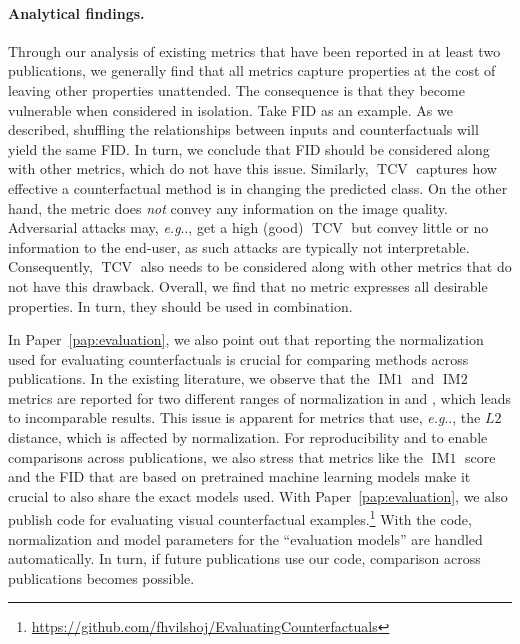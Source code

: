 \documentclass[11pt,a4paper,twoside,openright,final]{memoir}
\makeatletter
\DeclareRobustCommand\onedot{\futurelet\@let@token\@onedot}
\def\@onedot{\ifx\@let@token.\else.\null\fi\xspace}
\def\eg{\emph{e.g}\onedot} \def\Eg{\emph{E.g}\onedot}
\newcommand*{\paperref}[1]{Paper~\hyperref[#1]{\ref{#1}}}
\makeatother
\begin{document}
\paragraph{Analytical findings.}
Through our analysis of existing metrics that have been reported in at least two publications, we generally find that all metrics capture properties at the cost of leaving other properties unattended.
The consequence is that they become vulnerable when considered in isolation.
Take FID as an example.
As we described, shuffling the relationships between inputs and counterfactuals will yield the same FID.
In turn, we conclude that FID should be considered along with other metrics, which do not have this issue.
Similarly, $\operatorname{TCV}$ captures how effective a counterfactual method is in changing the predicted class. 
On the other hand, the metric does \emph{not} convey any information on the image quality.
Adversarial attacks may, \eg, get a high (good) $\operatorname{TCV}$ but convey little or no information to the end-user, as such attacks are typically not interpretable.
Consequently, $\operatorname{TCV}$ also needs to be considered along with other metrics that do not have this drawback.
Overall, we find that no metric expresses all desirable properties. In turn, they should be used in combination.

In \paperref{pap:evaluation}, we also point out that reporting the normalization used for evaluating counterfactuals is crucial for comparing methods across publications.
In the existing literature, we observe that the $\operatorname{IM1}$ and $\operatorname{IM2}$ metrics are reported for two different ranges of normalization in \cite{Mahajan2019} and \cite{VanLooveren2019}, which leads to incomparable results.
This issue is apparent for metrics that use, \eg, the $L2$ distance, which is affected by normalization.
For reproducibility and to enable comparisons across publications, we also stress that metrics like the $\operatorname{IM1}$ score and the FID that are based on pretrained machine learning models make it crucial to also share the exact models used.
With \paperref{pap:evaluation}, we also publish code for evaluating visual counterfactual examples.\footnote{\url{https://github.com/fhvilshoj/EvaluatingCounterfactuals}}
With the code, normalization and model parameters for the ``evaluation models'' are handled automatically.
In turn, if future publications use our code, comparison across publications becomes possible.
\end{document}
